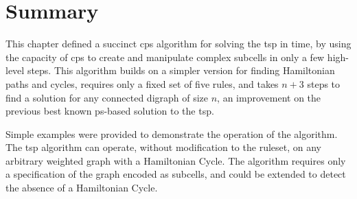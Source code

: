 \section{\label{sec:tsp:conc}Summary}
This chapter defined a succinct \gls{cps} algorithm for solving the \gls{tsp} in  time, by using the capacity of \gls{cps} to create and manipulate complex subcells in only a few high-level steps.  This algorithm builds on a simpler version for finding Hamiltonian paths and cycles, requires only a fixed set of five rules, and takes \(n + 3\) steps to find a solution for any connected digraph of size \(n\), an improvement on the previous best known \gls{ps}-based solution to the \gls{tsp}.

Simple examples were provided to demonstrate the operation of the algorithm.  The \gls{tsp} algorithm can operate, without modification to the \gls{ruleset}, on any arbitrary weighted graph with a Hamiltonian Cycle.   The algorithm requires only a specification of the graph encoded as subcells, and could be extended to detect the absence of a Hamiltonian Cycle.